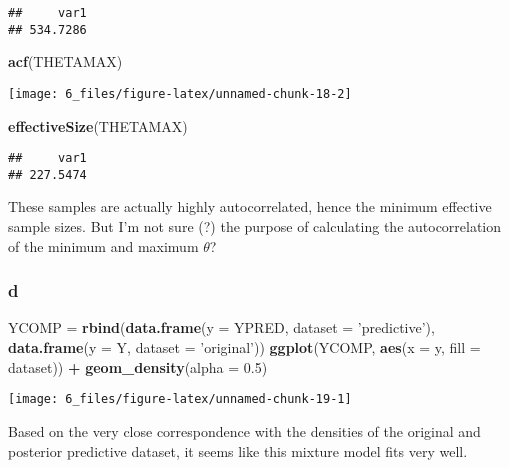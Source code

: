 \documentclass[]{article}
\newenvironment{Shaded}{\begin{snugshade}}{\end{snugshade}}
\newcommand{\DataTypeTok}[1]{\textcolor[rgb]{0.13,0.29,0.53}{#1}}
\newcommand{\FloatTok}[1]{\textcolor[rgb]{0.00,0.00,0.81}{#1}}
\newcommand{\KeywordTok}[1]{\textcolor[rgb]{0.13,0.29,0.53}{\textbf{#1}}}
\newcommand{\NormalTok}[1]{#1}
\newcommand{\OperatorTok}[1]{\textcolor[rgb]{0.81,0.36,0.00}{\textbf{#1}}}
\newcommand{\StringTok}[1]{\textcolor[rgb]{0.31,0.60,0.02}{#1}}
\begin{document}
\begin{verbatim}
##     var1 
## 534.7286
\end{verbatim}

\begin{Shaded}
\begin{Highlighting}[]
\KeywordTok{acf}\NormalTok{(THETAMAX)}
\end{Highlighting}
\end{Shaded}

\begin{center}\texttt{[image: 6\_files/figure-latex/unnamed-chunk-18-2]} \end{center}

\begin{Shaded}
\begin{Highlighting}[]
\KeywordTok{effectiveSize}\NormalTok{(THETAMAX)}
\end{Highlighting}
\end{Shaded}

\begin{verbatim}
##     var1 
## 227.5474
\end{verbatim}

These samples are actually highly autocorrelated, hence the minimum
effective sample sizes. But I'm not sure (?) the purpose of calculating
the autocorrelation of the minimum and maximum \(\theta\)?

\hypertarget{d-1}{%
\subsubsection{d}\label{d-1}}

\begin{Shaded}
\begin{Highlighting}[]
\NormalTok{YCOMP =}\StringTok{ }\KeywordTok{rbind}\NormalTok{(}\KeywordTok{data.frame}\NormalTok{(}\DataTypeTok{y =}\NormalTok{ YPRED, }\DataTypeTok{dataset =} \StringTok{'predictive'}\NormalTok{), }\KeywordTok{data.frame}\NormalTok{(}\DataTypeTok{y =}\NormalTok{ Y, }\DataTypeTok{dataset =} \StringTok{'original'}\NormalTok{))}
\KeywordTok{ggplot}\NormalTok{(YCOMP, }\KeywordTok{aes}\NormalTok{(}\DataTypeTok{x =}\NormalTok{ y, }\DataTypeTok{fill =}\NormalTok{ dataset)) }\OperatorTok{+}
\StringTok{  }\KeywordTok{geom_density}\NormalTok{(}\DataTypeTok{alpha =} \FloatTok{0.5}\NormalTok{)}
\end{Highlighting}
\end{Shaded}

\begin{center}\texttt{[image: 6\_files/figure-latex/unnamed-chunk-19-1]} \end{center}

Based on the very close correspondence with the densities of the
original and posterior predictive dataset, it seems like this mixture
model fits very well.
\end{document}
